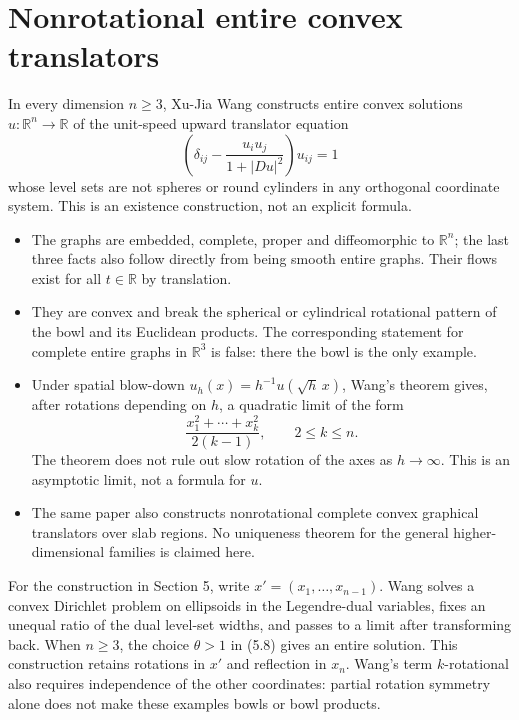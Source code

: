 \chapter{Nonrotational entire convex translators}\label{sec:catalogue-wang-entire-translators}
\begin{example}\label{ex:catalogue-wang-entire-translators}
In every dimension $n\geq3$, Xu-Jia Wang constructs entire convex solutions $u:\mathbb R^n\to\mathbb R$ of the unit-speed upward translator equation
\[
 \left(\delta_{ij}-\frac{u_i u_j}{1+|Du|^2}\right)u_{ij}=1
\]
whose level sets are not spheres or round cylinders in any orthogonal coordinate system. This is an existence construction, not an explicit formula.
\begin{itemize}
\item The graphs are embedded, complete, proper and diffeomorphic to $\mathbb R^n$; the last three facts also follow directly from being smooth entire graphs. Their flows exist for all $t\in\mathbb R$ by translation.
\item They are convex and break the spherical or cylindrical rotational pattern of the bowl and its Euclidean products. The corresponding statement for complete entire graphs in $\mathbb R^3$ is false: there the bowl is the only example.
\item Under spatial blow-down $u_h(x)=h^{-1}u(\sqrt h\,x)$, Wang's theorem gives, after rotations depending on $h$, a quadratic limit of the form
\[
 \frac{x_1^2+\cdots+x_k^2}{2(k-1)},\qquad 2\leq k\leq n.
\]
The theorem does not rule out slow rotation of the axes as $h\to\infty$. This is an asymptotic limit, not a formula for $u$.
\item The same paper also constructs nonrotational complete convex graphical translators over slab regions. No uniqueness theorem for the general higher-dimensional families is claimed here.
\end{itemize}
For the construction in Section 5, write $x'=(x_1,\ldots,x_{n-1})$. Wang solves a convex Dirichlet problem on ellipsoids in the Legendre-dual variables, fixes an unequal ratio of the dual level-set widths, and passes to a limit after transforming back. When $n\geq3$, the choice $\theta>1$ in (5.8) gives an entire solution. This construction retains rotations in $x'$ and reflection in $x_n$. Wang's term $k$-rotational also requires independence of the other coordinates: partial rotation symmetry alone does not make these examples bowls or bowl products.


\end{example}
